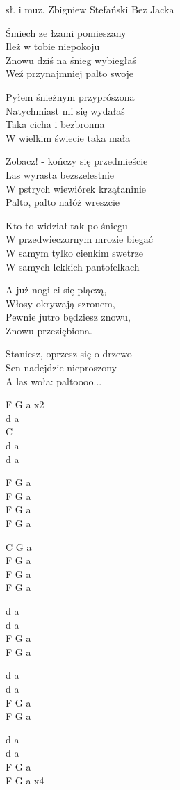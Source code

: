 {sł. i muz. Zbigniew Stefański}
{Bez Jacka}
\begin{text}
\hfill\break
Śmiech ze łzami pomieszany\\
Ileż w tobie niepokoju\\
Znowu dziś na śnieg wybiegłaś\\
Weź przynajmniej palto swoje

Pyłem śnieżnym przyprószona\\
Natychmiast mi się wydałaś\\
Taka cicha i bezbronna\\
W wielkim świecie taka mała

\vin Zobacz! - kończy się przedmieście\\
\vin Las wyrasta bezszelestnie\\
\vin W pstrych wiewiórek krzątaninie\\
\vin Palto, palto nałóż wreszcie

Kto to widział tak po śniegu\\
W przedwieczornym mrozie biegać\\
W samym tylko cienkim swetrze\\
W samych lekkich pantofelkach

A już nogi ci się plączą,\\
Włosy okrywają szronem,\\
Pewnie jutro będziesz znowu,\\
Znowu przeziębiona.

Staniesz, oprzesz się o drzewo\\
Sen nadejdzie nieproszony\\
A las woła: paltoooo...

\end{text}
\begin{chord}
    F G a x2\\
    d a\\
    C\\
    d a\\
    d a

    F G a\\
    F G a\\
    F G a\\
    F G a

    C G a\\
    F G a\\
    F G a\\
    F G a

    d a\\
    d a\\
    F G a\\
    F G a

    d a\\
    d a\\
    F G a\\
    F G a

    d a\\
    d a\\
    F G a\\
    F G a x4
\end{chord}